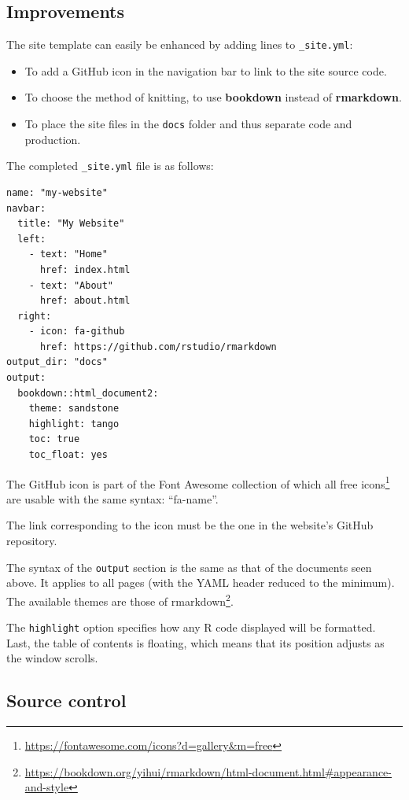\documentclass[
  12pt,
  american,
  a4paper,
  extrafontsizes,onecolumn,openright
  ]{memoir}
\providecommand{\tightlist}{%
  \setlength{\itemsep}{0pt}\setlength{\parskip}{0pt}}
\begin{document}
\hypertarget{improvements}{%
\subsection{Improvements}\label{improvements}}

The site template can easily be enhanced by adding lines to \texttt{\_site.yml}:

\begin{itemize}
\tightlist
\item
  To add a GitHub icon in the navigation bar to link to the site source code.
\item
  To choose the method of knitting, to use \textbf{bookdown} instead of \textbf{rmarkdown}.
\item
  To place the site files in the \texttt{docs} folder and thus separate code and production.
\end{itemize}

The completed \texttt{\_site.yml} file is as follows:

\begin{verbatim}
name: "my-website"
navbar:
  title: "My Website"
  left:
    - text: "Home"
      href: index.html
    - text: "About"
      href: about.html
  right:
    - icon: fa-github
      href: https://github.com/rstudio/rmarkdown
output_dir: "docs"
output:
  bookdown::html_document2:
    theme: sandstone
    highlight: tango
    toc: true
    toc_float: yes
\end{verbatim}

The GitHub icon is part of the Font Awesome collection of which all free icons\footnote{\url{https://fontawesome.com/icons?d=gallery\&m=free}} are usable with the same syntax: \enquote{fa-name}.

The link corresponding to the icon must be the one in the website's GitHub repository.

The syntax of the \texttt{output} section is the same as that of the documents seen above.
It applies to all pages (with the YAML header reduced to the minimum).
The available themes are those of rmarkdown\footnote{\url{https://bookdown.org/yihui/rmarkdown/html-document.html\#appearance-and-style}}.

The \texttt{highlight} option specifies how any R code displayed will be formatted.
Last, the table of contents is floating, which means that its position adjusts as the window scrolls.

\hypertarget{source-control}{%
\subsection{Source control}\label{source-control}}
\end{document}
